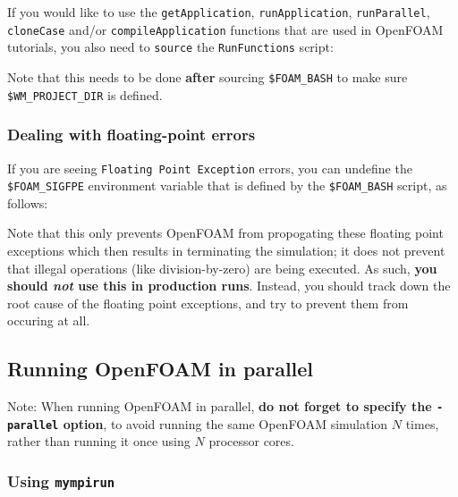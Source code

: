 If you would like to use the \texttt{\small{getApplication}}, \texttt{\small{runApplication}},
\texttt{\small{runParallel}}, \texttt{\small{cloneCase}} and/or \texttt{\small{compileApplication}} functions that are
used in OpenFOAM tutorials, you also need to \texttt{\small{source}} the \texttt{\small{RunFunctions}} script:

\begin{prompt}
\end{prompt}

Note that this needs to be done \textbf{after} sourcing \texttt{\small{\$FOAM\_BASH}} to make sure
\texttt{\small{\$WM\_PROJECT\_DIR}} is defined.


\subsubsection{Dealing with floating-point errors}

If you are seeing \texttt{\small{Floating Point Exception}} errors, you can undefine the
\texttt{\small{\$FOAM\_SIGFPE}} environment variable that is defined by the \texttt{\small{\$FOAM\_BASH}} script,
as follows:

\begin{prompt}
\end{prompt}

Note that this only prevents OpenFOAM from propogating these floating point exceptions which then results in
terminating the simulation; it does not prevent that illegal operations (like division-by-zero) are being executed.
As such, \textbf{you should \textit{not} use this in production runs}. Instead, you should track down the root cause
of the floating point exceptions, and try to prevent them from occuring at all.


\subsection{Running OpenFOAM in parallel}

Note: When running OpenFOAM in parallel, \textbf{do not forget to specify the \texttt{\small{-parallel}} option},
to avoid running the same OpenFOAM simulation $N$ times, rather than running it once using $N$ processor cores.

\subsubsection{Using \texttt{mympirun}}

